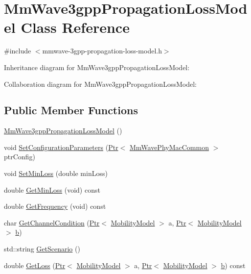 \hypertarget{classMmWave3gppPropagationLossModel}{}\section{Mm\+Wave3gpp\+Propagation\+Loss\+Model Class Reference}
\label{classMmWave3gppPropagationLossModel}


{\ttfamily \#include $<$mmwave-\/3gpp-\/propagation-\/loss-\/model.\+h$>$}



Inheritance diagram for Mm\+Wave3gpp\+Propagation\+Loss\+Model\+:


Collaboration diagram for Mm\+Wave3gpp\+Propagation\+Loss\+Model\+:
\subsection*{Public Member Functions}
\begin{DoxyCompactItemize}
\item 
\hyperlink{classMmWave3gppPropagationLossModel_ac9ec567e21cdb76918617e903e9f0f60}{Mm\+Wave3gpp\+Propagation\+Loss\+Model} ()
\item 
void \hyperlink{classMmWave3gppPropagationLossModel_a48c59beb5e2a7eb457165b54558430ce}{Set\+Configuration\+Parameters} (\hyperlink{classns3_1_1Ptr}{Ptr}$<$ \hyperlink{classns3_1_1MmWavePhyMacCommon}{Mm\+Wave\+Phy\+Mac\+Common} $>$ ptr\+Config)
\item 
void \hyperlink{classMmWave3gppPropagationLossModel_a1431e2e95ebb21292fbd8732868fe8ef}{Set\+Min\+Loss} (double min\+Loss)
\item 
double \hyperlink{classMmWave3gppPropagationLossModel_a13f78fefa8ddd09862e9b39ae5e3eabd}{Get\+Min\+Loss} (void) const 
\item 
double \hyperlink{classMmWave3gppPropagationLossModel_a40f8951a1d321f12f2d0f13eed13eb20}{Get\+Frequency} (void) const 
\item 
char \hyperlink{classMmWave3gppPropagationLossModel_aacc2e4ef3751ea067ccb9eb9d0bb8dbf}{Get\+Channel\+Condition} (\hyperlink{classns3_1_1Ptr}{Ptr}$<$ \hyperlink{classns3_1_1MobilityModel}{Mobility\+Model} $>$ a, \hyperlink{classns3_1_1Ptr}{Ptr}$<$ \hyperlink{classns3_1_1MobilityModel}{Mobility\+Model} $>$ \hyperlink{lte__pathloss_8m_a21ad0bd836b90d08f4cf640b4c298e7c}{b})
\item 
std\+::string \hyperlink{classMmWave3gppPropagationLossModel_ae092a58d42801c732956d64e0fe250eb}{Get\+Scenario} ()
\item 
double \hyperlink{classMmWave3gppPropagationLossModel_ae389c108155d92774975e8a8d0de9c6a}{Get\+Loss} (\hyperlink{classns3_1_1Ptr}{Ptr}$<$ \hyperlink{classns3_1_1MobilityModel}{Mobility\+Model} $>$ a, \hyperlink{classns3_1_1Ptr}{Ptr}$<$ \hyperlink{classns3_1_1MobilityModel}{Mobility\+Model} $>$ \hyperlink{lte__pathloss_8m_a21ad0bd836b90d08f4cf640b4c298e7c}{b}) const 
\end{DoxyCompactItemize}
